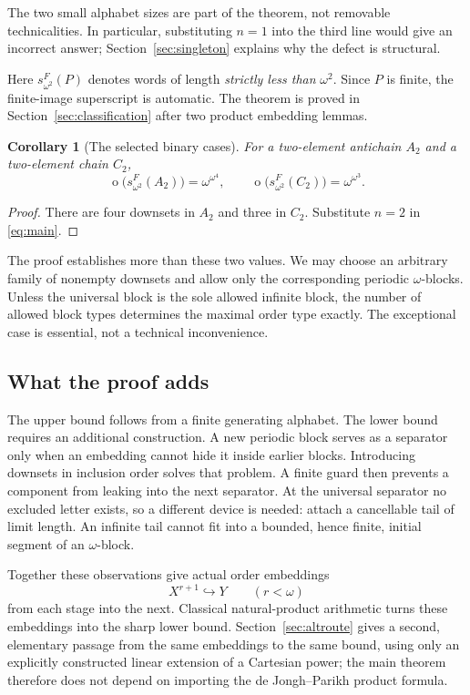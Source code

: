 \documentclass[11pt,a4paper]{article}
\numberwithin{equation}{section}
\newtheorem{corollary}[theorem]{Corollary}
\theoremstyle{definition}
\theoremstyle{remark}
\newcommand{\mot}{\mathop{o}}
\newcommand{\Wordspace}[1]{s_{\omega^2}^{F}(#1)}
\begin{document}
The two small alphabet sizes are part of the theorem, not removable
technicalities. In particular, substituting $n=1$ into the third line would
give an incorrect answer; Section~\ref{sec:singleton} explains why the defect
is structural.

Here $s_{\omega^2}^{F}(P)$ denotes words of length \emph{strictly less than}
$\omega^2$. Since $P$ is finite, the finite-image superscript is automatic.
The theorem is proved in Section~\ref{sec:classification} after two product
embedding lemmas.

\begin{corollary}[The selected binary cases]\label{cor:binary}
For a two-element antichain $A_2$ and a two-element chain $C_2$,
\[
 \mot\bigl(\Wordspace {A_2}\bigr)=\omega^{\omega^4},
 \qquad
 \mot\bigl(\Wordspace {C_2}\bigr)=\omega^{\omega^3}.
\]
\end{corollary}
\begin{proof}
There are four downsets in $A_2$ and three in $C_2$. Substitute $n=2$ in
\eqref{eq:main}.
\end{proof}

The proof establishes more than these two values. We may choose an arbitrary
family of nonempty downsets and allow only the corresponding periodic
$\omega$-blocks. Unless the universal block is the sole allowed infinite
block, the number of allowed block types determines the maximal order type
exactly. The exceptional case is essential, not a technical inconvenience.

\subsection{What the proof adds}
The upper bound follows from a finite generating alphabet. The lower bound
requires an additional construction. A new periodic block serves as a
separator only when an embedding cannot hide it inside earlier blocks.
Introducing downsets in inclusion order solves that problem. A finite guard
then prevents a component from leaking into the next separator. At the
universal separator no excluded letter exists, so a different device is
needed: attach a cancellable tail of limit length. An infinite tail cannot
fit into a bounded, hence finite, initial segment of an $\omega$-block.

Together these observations give actual order embeddings
\[
  X^{r+1}\hookrightarrow Y\qquad(r<\omega)
\]
from each stage into the next. Classical natural-product arithmetic turns
these embeddings into the sharp lower bound. Section~\ref{sec:altroute} gives
a second, elementary passage from the same embeddings to the same bound, using
only an explicitly constructed linear extension of a Cartesian power; the
main theorem therefore does not depend on importing the de Jongh--Parikh
product formula.
\end{document}
